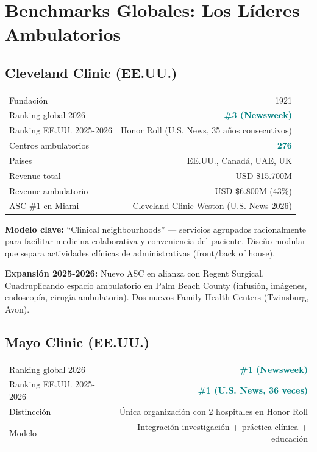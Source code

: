 \documentclass[11pt, a4paper]{article}
\newcommand{\highlight}[1]{\textcolor{teal}{\textbf{#1}}}
\newcommand{\fuente}[1]{\par\vspace{2pt}{\scriptsize\textcolor{slate}{Fuente: #1}}}
\begin{document}
\section{Benchmarks Globales: Los L\'{i}deres Ambulatorios}

\subsection{Cleveland Clinic (EE.UU.)}

\begin{center}
\begin{tabular}{@{}lr@{}}
\toprule
Fundaci\'{o}n & 1921 \\
Ranking global 2026 & \highlight{\#3 (Newsweek)} \\
Ranking EE.UU. 2025-2026 & Honor Roll (U.S. News, 35 a\~{n}os consecutivos) \\
Centros ambulatorios & \highlight{276} \\
Pa\'{i}ses & EE.UU., Canad\'{a}, UAE, UK \\
Revenue total & USD \$15.700M \\
Revenue ambulatorio & USD \$6.800M (43\%) \\
ASC \#1 en Miami & Cleveland Clinic Weston (U.S. News 2026) \\
\bottomrule
\end{tabular}
\end{center}

\textbf{Modelo clave:} ``Clinical neighbourhoods'' — servicios agrupados racionalmente para facilitar medicina colaborativa y conveniencia del paciente. Dise\~{n}o modular que separa actividades cl\'{i}nicas de administrativas (front/back of house).

\textbf{Expansi\'{o}n 2025-2026:} Nuevo ASC en alianza con Regent Surgical. Cuadruplicando espacio ambulatorio en Palm Beach County (infusi\'{o}n, im\'{a}genes, endoscop\'{i}a, cirug\'{i}a ambulatoria). Dos nuevos Family Health Centers (Twinsburg, Avon).

\fuente{Cleveland Clinic Newsroom 2026, U.S. News, Newsweek World's Best Hospitals 2026}

\subsection{Mayo Clinic (EE.UU.)}

\begin{center}
\begin{tabular}{@{}lr@{}}
\toprule
Ranking global 2026 & \highlight{\#1 (Newsweek)} \\
Ranking EE.UU. 2025-2026 & \highlight{\#1 (U.S. News, 36 veces)} \\
Distincci\'{o}n & \'{U}nica organizaci\'{o}n con 2 hospitales en Honor Roll \\
Modelo & Integraci\'{o}n investigaci\'{o}n + pr\'{a}ctica cl\'{i}nica + educaci\'{o}n \\
\bottomrule
\end{tabular}
\end{center}
\end{document}
